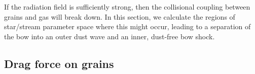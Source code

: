 


If the radiation field is sufficiently strong, then the collisional
coupling between grains and gas will break down.  In this section, we
calculate the regions of star/stream parameter space where this might
occur, leading to a separation of the bow into an outer dust wave and
an inner, dust-free bow shock.

\subsection{Drag force on grains}
\label{sec:drag-force-grains}

\begin{table}
  \centering
  \caption{Regimes of drag force as function of grain potential and slip speed}
  \label{tab:fdrag-regimes}
  \renewcommand\arraystretch{1.3}
\end{table}

